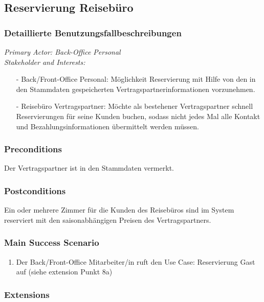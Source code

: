 \documentclass[./detailed_overview_usecases.tex]{subfiles}
\begin{document}
    \subsection{Reservierung Reisebüro}
    \subsubsection{Detaillierte Benutzungsfallbeschreibungen}

    \textit{Primary Actor: Back-Office Personal}
    \\
    \textit{Stakeholder and Interests:}
    \begin{itemize}
        \item[-] Back/Front-Office Personal: Möglichkeit Reservierung mit Hilfe von den in den Stammdaten gespeicherten Vertragspartnerinformationen vorzunehmen.
        \item[-] Reisebüro Vertragspartner: Möchte als bestehener Vertragspartner schnell Reservierungen für seine Kunden buchen, sodass nicht jedes
        Mal alle Kontakt und Bezahlungsinformationen übermittelt werden müssen.
    \end{itemize}

    \subsubsection*{Preconditions}
    Der Vertragspartner ist in den Stammdaten vermerkt.

    \subsubsection*{Postconditions}
    Ein oder mehrere Zimmer für die Kunden des Reisebüros sind im System reserviert mit den saisonabhängigen Preisen des Vertragspartners.

    \subsubsection*{Main Success Scenario}
    \begin{enumerate}
        \item Der Back/Front-Office Mitarbeiter/in ruft den Use Case: Reservierung Gast auf (siehe extension Punkt 8a)
    \end{enumerate}

    \subsubsection*{Extensions}
    \item
\end{document}
